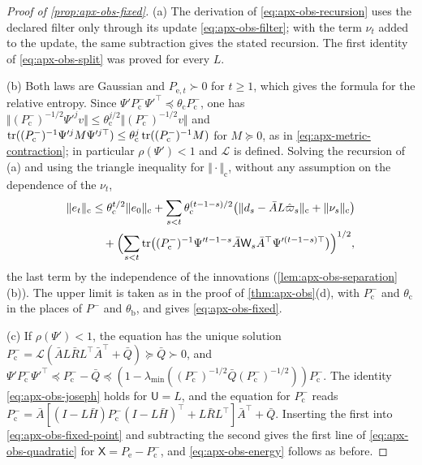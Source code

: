 \begin{proof}[Proof of \cref{prop:apx-obs-fixed}]
(a) The derivation of \eqref{eq:apx-obs-recursion} uses the declared filter only through its update \eqref{eq:apx-obs-filter}; with the term $\nu_t$ added to the update, the same subtraction gives the stated recursion. The first identity of \eqref{eq:apx-obs-split} was proved for every $L$.

(b) Both laws are Gaussian and $P_{\mathrm e,t}\succ0$ for $t\ge1$, which gives the formula for the relative entropy. Since $\Psi'P^-_{\mathrm c}\Psi'^\top\preceq\theta_{\mathrm c}P^-_{\mathrm c}$, one has $\Vert(P^-_{\mathrm c})^{-1/2}\Psi'^jv\Vert\le\theta_{\mathrm c}^{j/2}\Vert(P^-_{\mathrm c})^{-1/2}v\Vert$ and $\operatorname{tr}((P^-_{\mathrm c})^{-1}\Psi'^jM\Psi'^{j\top})\le\theta_{\mathrm c}^j\operatorname{tr}((P^-_{\mathrm c})^{-1}M)$ for $M\succeq0$, as in \cref{eq:apx-metric-contraction}; in particular $\rho(\Psi')<1$ and $\mathcal L$ is defined. Solving the recursion of (a) and using the triangle inequality for $\Vert\cdot\Vert_{\mathrm c}$, without any assumption on the dependence of the $\nu_t$,
\begin{equation*}
\begin{aligned}
\Vert e_t\Vert_{\mathrm c}&\le\theta_{\mathrm c}^{t/2}\Vert e_0\Vert_{\mathrm c}+\sum_{s<t}\theta_{\mathrm c}^{(t-1-s)/2}\bigl(\Vert d_s-\bar AL\hat\varpi_s\Vert_{\mathrm c}+\Vert\nu_s\Vert_{\mathrm c}\bigr)\\
&\quad+\Bigl(\sum_{s<t}\operatorname{tr}\bigl((P^-_{\mathrm c})^{-1}\Psi'^{t-1-s}\bar A\mathsf W_s\bar A^\top\Psi'^{(t-1-s)\top}\bigr)\Bigr)^{1/2},
\end{aligned}
\end{equation*}
the last term by the independence of the innovations (\cref{lem:apx-obs-separation}(b)). The upper limit is taken as in the proof of \cref{thm:apx-obs}(d), with $P^-_{\mathrm c}$ and $\theta_{\mathrm c}$ in the places of $P^-$ and $\theta_{\mathrm b}$, and gives \eqref{eq:apx-obs-fixed}.

(c) If $\rho(\Psi')<1$, the equation has the unique solution $P^-_{\mathrm c}=\mathcal L(\bar AL\bar RL^\top\bar A^\top+\bar Q)\succeq\bar Q\succ0$, and $\Psi'P^-_{\mathrm c}\Psi'^\top\preceq P^-_{\mathrm c}-\bar Q\preceq(1-\lambda_{\min}((P^-_{\mathrm c})^{-1/2}\bar Q(P^-_{\mathrm c})^{-1/2}))P^-_{\mathrm c}$. The identity \eqref{eq:apx-obs-joseph} holds for $\mathsf U=L$, and the equation for $P^-_{\mathrm c}$ reads $P^-_{\mathrm c}=\bar A[(I-L\bar H)P^-_{\mathrm c}(I-L\bar H)^\top+L\bar RL^\top]\bar A^\top+\bar Q$. Inserting the first into \eqref{eq:apx-obs-fixed-point} and subtracting the second gives the first line of \eqref{eq:apx-obs-quadratic} for $\mathsf X=P_{\mathrm e}-P^-_{\mathrm c}$, and \eqref{eq:apx-obs-energy} follows as before.
\end{proof}

